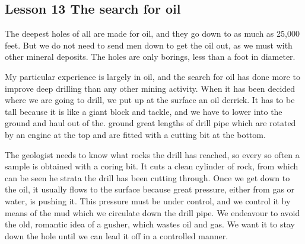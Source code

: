 \documentclass[kindlepaper]{BHCexam4kindle}
\begin{document}
\subsection{Lesson 13
The search for oil}
\par
The deepest holes of all are made for oil, and they go down to as much as 25,000
feet. But we do not need to send men down to get the oil out, as we must with
other mineral deposits. The holes are only borings, less than a foot in diameter.
\par
My particular experience is largely in oil, and the search for oil has done more to
improve deep drilling than any other mining activity. When it has been decided
where we are going to drill, we put up at the surface an oil derrick. It has to be
tall because it is like a giant block and tackle, and we have to lower into the
ground and haul out of the. ground great lengths of drill pipe which are rotated
by an engine at the top and are fitted with a cutting bit at the bottom.
\par
The geologist needs to know what rocks the drill has reached, so every so often
a sample is obtained with a coring bit. It cuts a clean cylinder of rock, from which
can be seen he strata the drill has been cutting through. Once we get down to
the oil, it usually flows to the surface because great pressure, either from gas or
water, is pushing it. This pressure must be under control, and we control it by
means of the mud which we circulate down the drill pipe. We endeavour to
avoid the old, romantic idea of a gusher, which wastes oil and gas. We want it to
stay down the hole until we can lead it off in a controlled manner.
\clearpage
\end{document}
